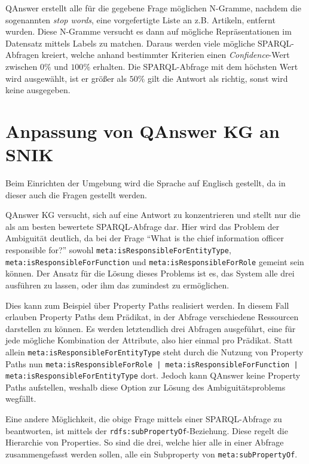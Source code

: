 \documentclass[utf8,biblatex]{lni}
\begin{document}
QAnswer erstellt alle für die gegebene Frage möglichen N-Gramme, nachdem die sogenannten \emph{stop words}, eine vorgefertigte Liste an z.B. Artikeln, entfernt wurden.
Diese N-Gramme versucht es dann auf mögliche Repräsentationen im Datensatz mittels Labels zu matchen.
Daraus werden viele mögliche SPARQL-Abfragen kreiert, welche anhand bestimmter Kriterien einen \emph{Confidence}-Wert zwischen $0\%$ und $100\%$ erhalten.
Die SPARQL-Abfrage mit dem höchsten Wert wird ausgewählt, ist er größer als $50\%$ gilt die Antwort als richtig, sonst wird keine ausgegeben.

\section{Anpassung von QAnswer KG an SNIK}

Beim Einrichten der Umgebung wird die Sprache auf Englisch gestellt, da in dieser auch die Fragen gestellt werden.

QAnswer KG versucht, sich auf eine Antwort zu konzentrieren und stellt nur die als am besten bewertete SPARQL-Abfrage dar.
Hier wird das Problem der Ambiguität deutlich, da bei der Frage \enquote{What is the chief information officer responsible for?} sowohl
\texttt{meta:isResponsibleForEntityType}, \texttt{meta:isResponsibleForFunction} und \texttt{meta:isResponsibleForRole} gemeint sein können.
Der Ansatz für die Lösung dieses Problems ist es, das System alle drei ausführen zu lassen, oder ihm das zumindest zu ermöglichen.

Dies kann zum Beispiel über Property Paths realisiert werden.
In diesem Fall erlauben Property Paths dem Prädikat, in der Abfrage verschiedene Ressourcen darstellen zu können.
Es werden letztendlich drei Abfragen ausgeführt, eine für jede mögliche Kombination der Attribute, also hier einmal pro Prädikat.
Statt allein \texttt{meta:isResponsibleForEntityType} steht durch die Nutzung von Property Paths nun \texttt{meta:isResponsibleForRole | meta:isResponsibleForFunction | meta:isResponsibleForEntityType} dort.
Jedoch kann QAnswer keine Property Paths aufstellen, weshalb diese Option zur Lösung des Ambiguitätsproblems wegfällt.

Eine andere Möglichkeit, die obige Frage mittels einer SPARQL-Abfrage zu beantworten, ist mittels der \texttt{rdfs:subPropertyOf}-Beziehung.
Diese regelt die Hierarchie von Properties.
So sind die drei, welche hier alle in einer Abfrage zusammengefasst werden sollen, alle ein Subproperty von \texttt{meta:subPropertyOf}.
\end{document}

